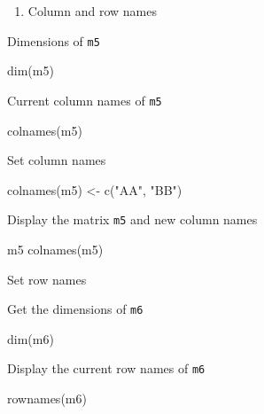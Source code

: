 \documentclass[
  letterpaper,
  DIV=11,
  numbers=noendperiod]{scrreprt}
\newenvironment{Shaded}{}{}
\newcommand{\FunctionTok}[1]{\textcolor[rgb]{0.44,0.26,0.76}{#1}}
\newcommand{\NormalTok}[1]{\textcolor[rgb]{0.14,0.16,0.18}{#1}}
\newcommand{\OtherTok}[1]{\textcolor[rgb]{0.44,0.26,0.76}{#1}}
\newcommand{\StringTok}[1]{\textcolor[rgb]{0.01,0.18,0.38}{#1}}
\providecommand{\tightlist}{%
  \setlength{\itemsep}{0pt}\setlength{\parskip}{0pt}}\usepackage{longtable,booktabs,array}
\begin{document}
\begin{enumerate}
\def\labelenumi{\alph{enumi}.}
\setcounter{enumi}{5}
\tightlist
\item
  Column and row names
\end{enumerate}

Dimensions of \texttt{m5}

\begin{Shaded}
\begin{Highlighting}[]
\FunctionTok{dim}\NormalTok{(m5)}
\end{Highlighting}
\end{Shaded}

Current column names of \texttt{m5}

\begin{Shaded}
\begin{Highlighting}[]
\FunctionTok{colnames}\NormalTok{(m5)}
\end{Highlighting}
\end{Shaded}

Set column names

\begin{Shaded}
\begin{Highlighting}[]
\FunctionTok{colnames}\NormalTok{(m5) }\OtherTok{\textless{}{-}} \FunctionTok{c}\NormalTok{(}\StringTok{"AA"}\NormalTok{, }\StringTok{"BB"}\NormalTok{)}
\end{Highlighting}
\end{Shaded}

Display the matrix \texttt{m5} and new column names

\begin{Shaded}
\begin{Highlighting}[]
\NormalTok{m5}
\FunctionTok{colnames}\NormalTok{(m5)}
\end{Highlighting}
\end{Shaded}

Set row names

Get the dimensions of \texttt{m6}

\begin{Shaded}
\begin{Highlighting}[]
\FunctionTok{dim}\NormalTok{(m6)}
\end{Highlighting}
\end{Shaded}

Display the current row names of \texttt{m6}

\begin{Shaded}
\begin{Highlighting}[]
\FunctionTok{rownames}\NormalTok{(m6)}
\end{Highlighting}
\end{Shaded}
\end{document}
